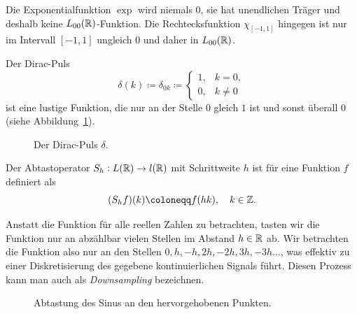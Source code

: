 \begin{example}[$ L_{00}(\R) $-Funktion]
Die Exponentialfunktion $ \exp $ wird niemals $ 0 $, sie hat unendlichen Träger und
deshalb keine $ L_{00}(\R) $-Funktion. Die Rechtecksfunktion $ \chi_{[-1,1]} $ hingegen ist nur
im Intervall $ [-1,1] $ ungleich $ 0 $ und daher in $ L_{00}(\R) $.
\end{example}

\begin{definition}
Der Dirac-Puls
\[
  \delta(k) \coloneqq \delta_{0k} \coloneqq 
  \begin{cases}
    1,& k = 0, \\ 0,& k \neq 0
  \end{cases}
\]
ist eine lustige Funktion, die nur an der Stelle $ 0 $ gleich $ 1 $ ist und sonst überall $ 0 $
(siehe Abbildung~\ref{fig:dirac}).
\begin{figure}[ht]
\centering
{}
\label{fig:dirac}
\caption{Der Dirac-Puls $ \delta $.}
\end{figure}
\end{definition}

\begin{definition}[Abtastoperator]
Der Abtastoperator $  S_{h} : L(\mathbb{R}) \rightarrow l(\mathbb{R}) $ mit Schrittweite $ h $ ist für eine
Funktion $ f $ definiert als
\[
  (S_{h}f)(k) \coloneqq f(hk), \quad k \in \Z.
\]
\end{definition}

\begin{remark}[Abtastoperator]
Anstatt die Funktion für alle reellen Zahlen zu betrachten, tasten wir die Funktion
nur an abzählbar vielen Stellen im Abstand $ h \in \mathbb{R} $ ab. Wir betrachten
die Funktion also nur an den Stellen $ 0, h, -h, 2h, -2h, 3h, -3h \dots $, was effektiv zu einer
Diskretisierung des gegebene kontinuierlichen Signals führt. Diesen Prozess kann man auch als
\emph{Downsampling} bezeichnen.
\end{remark}

\begin{figure}[ht]
\centering
{}
\label{fig:abtastoperator}
\caption{Abtastung des Sinus an den hervorgehobenen Punkten.}
\end{figure}